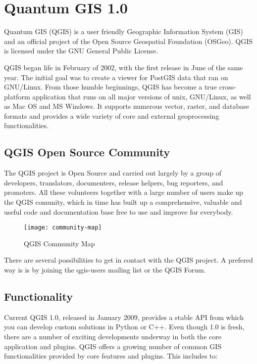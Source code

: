 \section{Quantum GIS 1.0}
\setcounter{page}{1}

Quantum GIS (QGIS) is a user friendly Geographic Information System (GIS) and
an official project of the Open Source Geospatial Foundation (OSGeo). QGIS is
licensed under the GNU General Public License.


QGIS began life in February of 2002, with the first release in June of the
same year. The initial goal was to create a viewer for PostGIS data that ran
on GNU/Linux. From those humble beginnings, QGIS has become a true
cross-platform application that runs on all major versions of unix,
GNU/Linux, as well as Mac OS and MS Windows. It supports numerous vector,
raster, and database formats and provides a wide variety of core and external
geoprocessing functionalities.

\subsection{QGIS Open Source Community}

The QGIS project is Open Source and carried out largely by a group of
developers, translators, documenters, release helpers, bug reporters, and
promoters. All these volunteers together with a large number of users make up
the QGIS comunity, which in time has built up a comprehensive, valuable and
useful code and documentation base free to use and improve for everybody.

\begin{figure}[h]
   \begin{center}
   \caption{QGIS Community Map}\label{fig:community-map}\smallskip
   \texttt{[image: community-map]}
\end{center}
\end{figure}

There are several possibilities to get in contact with the QGIS project. 
A prefered way is is by joining the qgis-users mailing list or the QGIS Forum. 

\subsection{Functionality}

Current QGIS 1.0, released in January 2009, provides a stable API from which
you can develop custom solutions in Python or C++. Even though 1.0 is fresh,
there are a number of exciting developments underway in both the core
application and plugins. QGIS offers a growing number of common GIS
functionalities provided by core features and plugins. This includes to:

